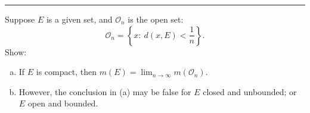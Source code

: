 \documentclass[letterpaper, 12pt]{article}
\begin{document}
\noindent\rule{7in}{2.8pt}
\begin{problem}{1.5}
Suppose \(E\) is a given set, and \(\mathcal{O}_n\) is the open set:
\[\mathcal{O}_n=\left\{ x:\ d(x,E)<\frac{1}{n} \right\}.\]
Show:
\begin{enumerate}[(a)]
    \item If \(E\) is compact, then \(m(E)=\lim_{n\to \infty}m(\mathcal{O}_n)\).
    \item However, the conclusion in (a) may be false for \(E\) closed and unbounded; or \(E\) open and bounded.
\end{enumerate}
\end{problem}
\end{document}

